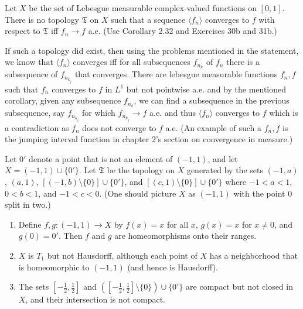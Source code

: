 \documentclass[12pt,a4paper]{article}
\begin{document}
\begin{problem}\label{prob:4-36}
Let $X$ be the set of Lebesgue measurable complex-valued functions on $[0,1]$. There is no topology $\mathfrak{T}$ on $X$ such that a sequence $\langle f_n \rangle$ converges to $f$ with respect to $\mathfrak{T}$ iff $f_n \to f$ a.e. (Use Corollary 2.32 and Exercises 30b and 31b.)
\end{problem}
\begin{solution}
    If such a topology did exist, then using the problems mentioned in the statement, we know that $\langle f_n\rangle$ converges iff for all subsequences $f_{n_k}$ of $f_n$ there is a subsequence of $f_{n_{k_j}}$ that converges. 
    There are lebesgue measurable functions $f_n,f$ such that $f_n$ converges to $f$ in $L^1$ but not pointwise a.e. and by the mentioned corollary, given any subsequence $f_{n_k}$, we can find a subsequence in the previous subsequence, say $f_{n_{k_j}}$ for which $f_{n_{k_j}}\to f$ a.e. and thus $\langle f_n\rangle$ converges to $f$ which is a contradiction as $f_n$ does not converge to $f$ a.e. (An example of such a $f_n,f$ is the jumping interval function in chapter 2's section on convergence in measure.)
\end{solution}
\begin{problem}\label{prob:4-37}
Let $0'$ denote a point that is not an element of $(-1,1)$, and let $X = (-1,1) \cup \{0'\}$. Let $\mathfrak{T}$ be the topology on $X$ generated by the sets $(-1, a)$, $(a, 1)$, $[(-1,b) \setminus \{0\}] \cup \{0'\}$, and $[(c,1) \setminus \{0\}] \cup \{0'\}$ where $-1 < a < 1$, $0 < b < 1$, and $-1 < c < 0$. (One should picture $X$ as $(-1,1)$ with the point $0$ split in two.)
\begin{enumerate}[label=\alph*.]
    \item Define $f,g : (-1,1) \to X$ by $f(x) = x$ for all $x$, $g(x) = x$ for $x \neq 0$, and $g(0) = 0'$. Then $f$ and $g$ are homeomorphisms onto their ranges.
    \item $X$ is $T_1$ but not Hausdorff, although each point of $X$ has a neighborhood that is homeomorphic to $(-1,1)$ (and hence is Hausdorff).
    \item The sets $[-\frac{1}{2}, \frac{1}{2}]$ and $([-\frac{1}{2}, \frac{1}{2}] \setminus \{0\}) \cup \{0'\}$ are compact but not closed in $X$, and their intersection is not compact.
\end{enumerate}
\end{problem}
\end{document}
